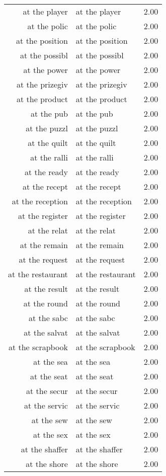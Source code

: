 \begin{table}[ht]
\begin{tabular}{rlr}
  at the player & at the player & 2.00 \\ 
  at the polic & at the polic & 2.00 \\ 
  at the position & at the position & 2.00 \\ 
  at the possibl & at the possibl & 2.00 \\ 
  at the power & at the power & 2.00 \\ 
  at the prizegiv & at the prizegiv & 2.00 \\ 
  at the product & at the product & 2.00 \\ 
  at the pub & at the pub & 2.00 \\ 
  at the puzzl & at the puzzl & 2.00 \\ 
  at the quilt & at the quilt & 2.00 \\ 
  at the ralli & at the ralli & 2.00 \\ 
  at the ready & at the ready & 2.00 \\ 
  at the recept & at the recept & 2.00 \\ 
  at the reception & at the reception & 2.00 \\ 
  at the register & at the register & 2.00 \\ 
  at the relat & at the relat & 2.00 \\ 
  at the remain & at the remain & 2.00 \\ 
  at the request & at the request & 2.00 \\ 
  at the restaurant & at the restaurant & 2.00 \\ 
  at the result & at the result & 2.00 \\ 
  at the round & at the round & 2.00 \\ 
  at the sabc & at the sabc & 2.00 \\ 
  at the salvat & at the salvat & 2.00 \\ 
  at the scrapbook & at the scrapbook & 2.00 \\ 
  at the sea & at the sea & 2.00 \\ 
  at the seat & at the seat & 2.00 \\ 
  at the secur & at the secur & 2.00 \\ 
  at the servic & at the servic & 2.00 \\ 
  at the sew & at the sew & 2.00 \\ 
  at the sex & at the sex & 2.00 \\ 
  at the shaffer & at the shaffer & 2.00 \\ 
  at the shore & at the shore & 2.00 \\ 

\end{tabular}
\end{table}
